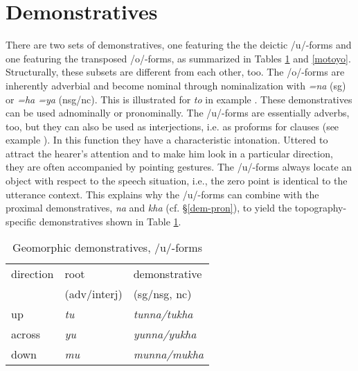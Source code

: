 \section{Demonstratives}\label{dem-pron-2}	

There are two sets of demonstratives, one featuring the the deictic /u/-forms and one featuring the transposed /o/-forms, as summarized in Tables \ref{mutuyu} and \ref{motoyo}. Structurally, these subsets are different from each other, too.  The /o/-forms are inherently adverbial and become nominal through nominalization with \emph{=na} ({\sc sg}) or \emph{=ha \ti =ya} ({\sc nsg/nc}). This is illustrated for \emph{to} in example \Next. These demonstratives can be used adnominally or pronominally. 
The /u/-forms are  essentially adverbs, too, but they can also be used as interjections, i.e. as proforms for clauses (see example \NNext). In this function they have a characteristic intonation. Uttered to attract the hearer's attention and to make him look in a particular direction, they are often accompanied by pointing gestures. The /u/-forms always locate an object with respect to the speech situation, i.e., the zero point is identical to the utterance context. This explains why the /u/-forms can combine with the proximal demonstratives, \emph{na} and \emph{kha} (cf. §\ref{dem-pron}),  to yield the topography-specific demonstratives shown in Table \ref{mutuyu}. 

\begin{table}[htp]
\begin{centering}
\begin{tabular}{lll}
\toprule
 {\sc direction} & {\sc root} & {\sc demonstrative}  \\
  & {\sc   ({\sc adv/interj})} & ({\sc sg/nsg, nc})\\
\midrule
{\sc up}&\emph{tu} &\emph{tunna/tukha}\\
{\sc across } &\emph{yu} &\emph{yunna/yukha}\\
{\sc down}&\emph{mu} &\emph{munna/mukha}\\
\bottomrule
\end{tabular}\\
\caption{Geomorphic demonstratives,  /u/-forms} \label{mutuyu}
\end{centering}
\end{table}


